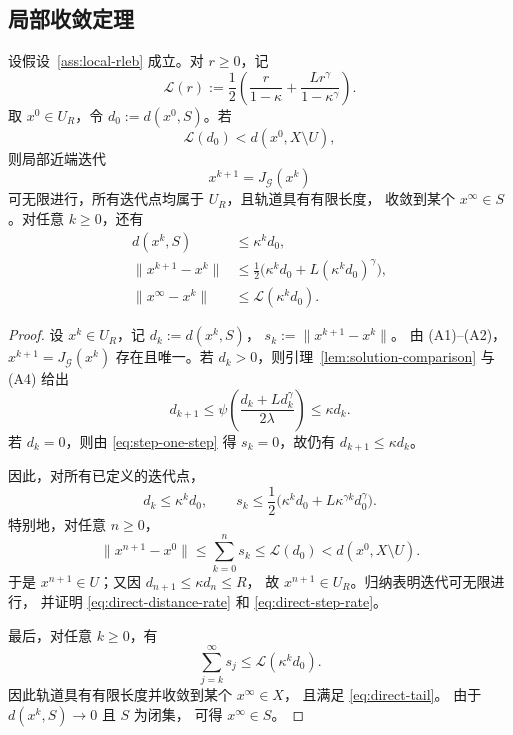 \subsection{局部收敛定理}

\begin{theorem}
\label{thm:two-branch-RLEB}
设假设~\ref{ass:local-rleb} 成立。对 $r\geq0$，记
\[
 \mathcal L(r):=
 \frac12\left(
   \frac{r}{1-\kappa}
   +\frac{Lr^\gamma}{1-\kappa^\gamma}
 \right).
\]
取 $x^0\in U_R$，令 $d_0:=d(x^0,S)$。若
\begin{equation}
\label{eq:direct-localization}
 \mathcal L(d_0)<d(x^0,X\setminus U),
\end{equation}
则局部近端迭代
\begin{equation}
\label{eq:PPA}
 x^{k+1}=J_{\mathcal G}(x^k)
\end{equation}
可无限进行，所有迭代点均属于 $U_R$，且轨道具有有限长度，
收敛到某个 $x^\infty\in S$。对任意 $k\geq0$，还有
\begin{align}
\label{eq:direct-distance-rate}
 d(x^k,S)&\leq\kappa^k d_0,\\
\label{eq:direct-step-rate}
 \|x^{k+1}-x^k\|
 &\leq\frac12\bigl(\kappa^k d_0
                   +L(\kappa^k d_0)^\gamma\bigr),\\
\label{eq:direct-tail}
 \|x^\infty-x^k\|
 &\leq\mathcal L(\kappa^k d_0).
\end{align}
\end{theorem}

\begin{proof}
设 $x^k\in U_R$，记
$d_k:=d(x^k,S)$，
$s_k:=\|x^{k+1}-x^k\|$。
由 (A1)--(A2)，$x^{k+1}=J_{\mathcal G}(x^k)$
存在且唯一。若 $d_k>0$，则引理~\ref{lem:solution-comparison}
与 (A4) 给出
\[
 d_{k+1}
 \leq\psi\!\left(
   \frac{d_k+Ld_k^\gamma}{2\lambda}
 \right)
 \leq\kappa d_k.
\]
若 $d_k=0$，则由 \eqref{eq:step-one-step} 得
$s_k=0$，故仍有 $d_{k+1}\leq\kappa d_k$。

因此，对所有已定义的迭代点，
\[
 d_k\leq\kappa^k d_0,\qquad
 s_k\leq\frac12\bigl(
   \kappa^k d_0+L\kappa^{\gamma k}d_0^\gamma
 \bigr).
\]
特别地，对任意 $n\geq0$，
\[
 \|x^{n+1}-x^0\|
 \leq\sum_{k=0}^{n}s_k
 \leq\mathcal L(d_0)
 <d(x^0,X\setminus U).
\]
于是 $x^{n+1}\in U$；又因
$d_{n+1}\leq\kappa d_n\leq R$，
故 $x^{n+1}\in U_R$。归纳表明迭代可无限进行，
并证明 \eqref{eq:direct-distance-rate}
和 \eqref{eq:direct-step-rate}。

最后，对任意 $k\geq0$，有
\[
 \sum_{j=k}^{\infty}s_j
 \leq\mathcal L(\kappa^k d_0).
\]
因此轨道具有有限长度并收敛到某个 $x^\infty\in X$，
且满足 \eqref{eq:direct-tail}。
由于 $d(x^k,S)\to0$ 且 $S$ 为闭集，
可得 $x^\infty\in S$。
\end{proof}

